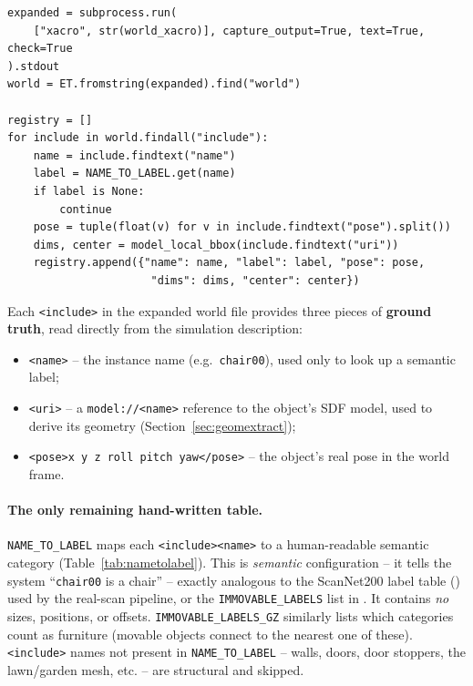 \documentclass[11pt]{article}
\begin{document}
\begin{lstlisting}[caption={\texttt{build\_scene\_graph\_gazebo.py}: world parsing (excerpt)}]
expanded = subprocess.run(
    ["xacro", str(world_xacro)], capture_output=True, text=True, check=True
).stdout
world = ET.fromstring(expanded).find("world")

registry = []
for include in world.findall("include"):
    name = include.findtext("name")
    label = NAME_TO_LABEL.get(name)
    if label is None:
        continue
    pose = tuple(float(v) for v in include.findtext("pose").split())
    dims, center = model_local_bbox(include.findtext("uri"))
    registry.append({"name": name, "label": label, "pose": pose,
                      "dims": dims, "center": center})
\end{lstlisting}

Each \texttt{<include>} in the expanded world file provides three pieces of
\textbf{ground truth}, read directly from the simulation description:

\begin{itemize}
  \item \texttt{<name>} -- the instance name (e.g.\ \texttt{chair00}), used only to look up a semantic label;
  \item \texttt{<uri>} -- a \texttt{model://<name>} reference to the object's SDF model, used to derive its geometry (Section~\ref{sec:geomextract});
  \item \texttt{<pose>x y z roll pitch yaw</pose>} -- the object's real pose in the world frame.
\end{itemize}

\paragraph{The only remaining hand-written table.} \texttt{NAME\_TO\_LABEL}
maps each \texttt{<include><name>} to a human-readable semantic category
(Table~\ref{tab:nametolabel}). This is \emph{semantic} configuration -- it
tells the system ``\texttt{chair00} is a chair'' -- exactly analogous to the
ScanNet200 label table () used by the
real-scan pipeline, or the \texttt{IMMOVABLE\_LABELS} list in
. It contains \emph{no} sizes, positions, or
offsets. \texttt{IMMOVABLE\_LABELS\_GZ} similarly lists which categories count
as furniture (movable objects connect to the nearest one of these).
\texttt{<include>} names not present in \texttt{NAME\_TO\_LABEL} -- walls,
doors, door stoppers, the lawn/garden mesh, etc. -- are structural and
skipped.
\end{document}
